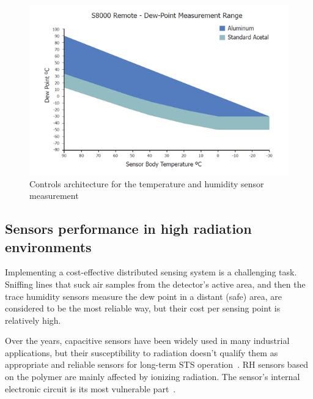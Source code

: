 \begin{figure}[!h]
\centering
\includegraphics[width=0.65\columnwidth]{Chapter5/images/s8000_remote.png}
\caption{Controls architecture for the temperature and humidity sensor measurement}
\label{fig:fos_mirror}
\end{figure}
\newpage
\subsection{Sensors performance in high radiation environments}
Implementing a cost-effective distributed sensing system is a challenging task. Sniffing lines that suck air samples from the detector's active area, and then the trace humidity sensors measure the dew point in a distant (safe) area, are considered to be the most reliable way, but their cost per sensing point is relatively high. 

Over the years, capacitive sensors have been widely used in many industrial applications, but their susceptibility to radiation doesn't qualify them as appropriate and reliable sensors for long-term \gls{STS} operation~\cite{Kapic, capacitive_irrad, Berruti}.  RH sensors based on the polymer are mainly affected by ionizing radiation. The sensor's internal electronic circuit is its most vulnerable part~\cite{SHCHEMEROV20222871}.

